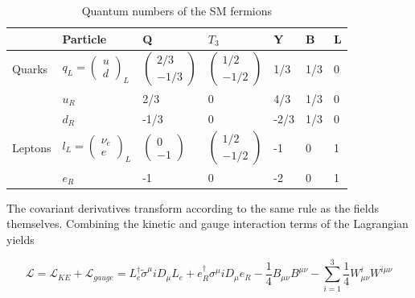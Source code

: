  \begin{table}[h!]
	\centering
	\label{qun}
	\begin{tabular}{|l|l|l|l|l|l|l|}
		\hline
		                & Particle & Q   & $T_{3}$ & Y & B & L \\ \hline
		Quarks          & $q_{L} = \begin{pmatrix}
									u \\
									d
									\end{pmatrix}_{L}$ & $\begin{pmatrix} 2/3 \\ -1/3 \end{pmatrix}$  & $\begin{pmatrix} 1/2 \\ -1/2 \end{pmatrix}$ & 1/3 & 1/3 & 0 \\ 
		                & $u_{R}$ & 2/3 & 0 & 4/3 & 1/3 & 0 \\ 
		                & $d_{R}$ & -1/3& 0 & -2/3 & 1/3 & 0 \\ \hline
		Leptons         & $l_{L} = \begin{pmatrix} \nu_{e}\\ e \end{pmatrix}_{L}$ & $\begin{pmatrix} 0 \\ -1 \end{pmatrix}$ & $\begin{pmatrix} 1/2 \\ -1/2 \end{pmatrix}$ & -1 & 0 & 1 \\
		                & $e_{R}$ & -1 & 0 & -2 & 0 & 1 \\ \hline
	
	\end{tabular}
	\caption{Quantum numbers of the SM fermions}
\end{table}

 The covariant derivatives transform according to the same rule as the fields themselves. Combining the kinetic and gauge interaction terms of the Lagrangian yields

 \begin{equation}
 \mathcal{L} = \mathcal{L}_{KE} + \mathcal{L}_{gauge}= L_{e}^{\dagger}\tilde{\sigma}^{\mu}iD_{\mu}L_{e}+e_{R}^{\dagger}\sigma^{\mu}iD_{\mu}e_{R} - \frac{1}{4}B_{\mu\nu}B^{\mu\nu}- \sum_{i=1}^{3}\frac{1}{4}W_{\mu\nu}^{i}W^{i\mu\nu}
 \end{equation}


